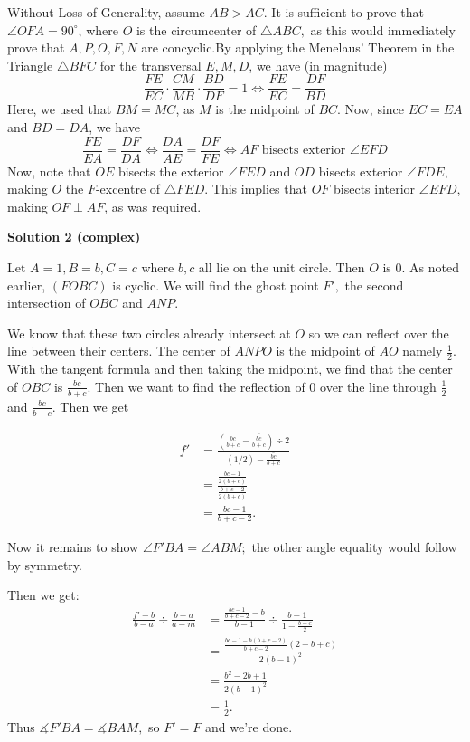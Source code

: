 \begin{enumerate}
Without Loss of Generality, assume $AB >AC$. It is sufficient to prove that $\angle OFA = 90^{\circ}$, where $O$ is the circumcenter of $\triangle{ABC},$ as this would immediately prove that $A,P,O,F,N$ are concyclic.By applying the Menelaus' Theorem in the Triangle $\triangle BFC$ for the transversal $E,M,D$, we have (in magnitude)
 \[\frac{FE}{EC} \cdot \frac{CM}{MB} \cdot \frac{BD}{DF} = 1 \iff \frac{FE}{EC} = \frac{DF}{BD}\] Here, we used that $BM=MC$, as $M$ is the midpoint of $BC$. Now, since $EC =EA$ and $BD=DA$, we have
 \[\frac{FE}{EA} = \frac{DF}{DA} \iff \frac{DA}{AE} = \frac{DF}{FE} \iff AF \text{ bisects exterior } \angle EFD\]Now, note that $OE$ bisects the exterior $\angle FED$ and $OD$ bisects exterior $\angle FDE$, making $O$ the $F$-excentre of $\triangle FED$. This implies that $OF$ bisects interior $\angle EFD$, making $OF \perp AF$, as was required.

 



\textbf{Solution 2 (complex)}

Let $A=1,B=b,C=c$ where $b,c$ all lie on the unit circle. Then $O$ is 0. As noted earlier, $(FOBC)$ is cyclic. We will find the ghost point $F',$ the second intersection of $OBC$ and $ANP$.

 We know that these two circles already intersect at $O$ so we can reflect over the line between their centers. The center of $ANPO$ is the midpoint of $AO$ namely $\frac12$. With the tangent formula and then taking the midpoint, we find that the center of $OBC$ is $\frac{bc}{b+c}.$ Then we want to find the reflection of 0 over the line through $\frac12$ and $\frac{bc}{b+c}.$ Then we get

 
 \begin{align*} f' &= \frac{\left(\frac{bc}{b+c}-\overline{\frac{bc}{b+c}}\right)\div2}{(1/2)-\overline{\frac{bc}{b+c}}}\\ &= \frac{\frac{bc-1}{2(b+c)}}{\frac{b+c-2}{2(b+c)}}\\ &= \frac{bc-1}{b+c-2}. \end{align*}


 Now it remains to show $\angle F'BA=\angle ABM;$ the other angle equality would follow by symmetry.

 Then we get:
 \begin{align*} \frac{f'-b}{b-a}\div\frac{b-a}{a-m} &=\frac{\frac{bc-1}{b+c-2}-b}{b-1}\div\frac{b-1}{1-\frac{b+c}2}\\ &=\frac{\frac{bc-1-b(b+c-2)}{b+c-2}(2-b+c)}{2(b-1)^2}\\ &=\frac{b^2-2b+1}{2(b-1)^2}\\ &=\frac12. \end{align*}
Thus $\measuredangle F'BA=\measuredangle BAM,$ so $F'=F$ and we're done.


\end{enumerate}
